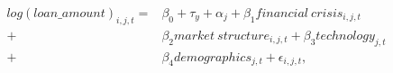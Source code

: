 \begin{equation}\begin{split}
log(loan\_amount)_{i,j,t} = & \beta_0 + \tau_{y} + \alpha_{j} + \beta_1 financial\ crisis_{i,j,t} \\ 
+ &  \beta_2 market\ structure_{i,j,t} + \beta_3 technology_{j,t}\\ 
+ &  \beta_4 demographics_{j,t} +\epsilon_{i,j,t},
     \end{split}\end{equation}
